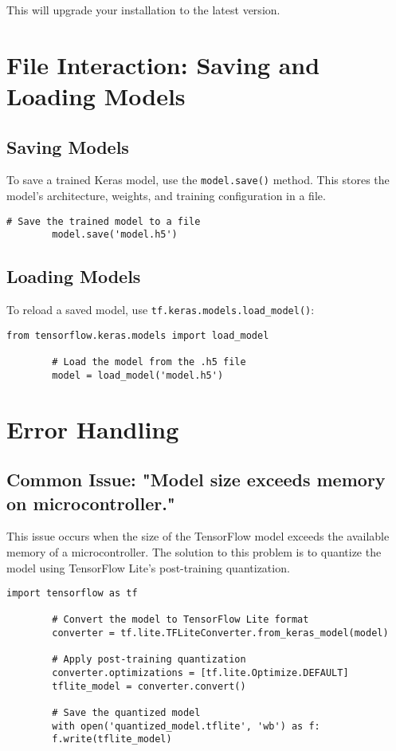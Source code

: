 	This will upgrade your installation to the latest version.
	
	\section{File Interaction: Saving and Loading Models}
	
	\subsection{Saving Models}
	To save a trained Keras model, use the \texttt{model.save()} method. This stores the model's architecture, weights, and training configuration in a file.
	
	\begin{lstlisting}[caption={Saving a Keras Model}, label={code:save-model}, style=pythonstyle]
		# Save the trained model to a file
		model.save('model.h5')
	\end{lstlisting}
	
	\subsection{Loading Models}
	To reload a saved model, use \texttt{tf.keras.models.load\_model()}:
	
	\begin{lstlisting}[caption={Loading a Keras Model}, label={code:load-model}, style=pythonstyle]
		from tensorflow.keras.models import load_model
		
		# Load the model from the .h5 file
		model = load_model('model.h5')
	\end{lstlisting}
	
	\section{Error Handling}
	
	\subsection{Common Issue: "Model size exceeds memory on microcontroller."}
	This issue occurs when the size of the TensorFlow model exceeds the available memory of a microcontroller. The solution to this problem is to quantize the model using TensorFlow Lite's post-training quantization.
	
	\begin{lstlisting}[caption={Post-Training Quantization}, label={code:quantization}, style=pythonstyle]
		import tensorflow as tf
		
		# Convert the model to TensorFlow Lite format
		converter = tf.lite.TFLiteConverter.from_keras_model(model)
		
		# Apply post-training quantization
		converter.optimizations = [tf.lite.Optimize.DEFAULT]
		tflite_model = converter.convert()
		
		# Save the quantized model
		with open('quantized_model.tflite', 'wb') as f:
		f.write(tflite_model)
	\end{lstlisting}
	
